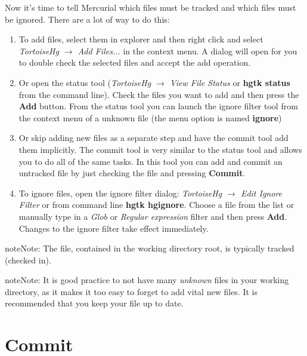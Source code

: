 \documentclass[letterpaper,10pt,english]{manual}
\begin{document}
Now it's time to tell Mercurial which files must be tracked and which
files must be ignored. There are a lot of way to do this:
\begin{enumerate}
\item {} 
To add files, select them in explorer and then right click and select
\emph{TortoiseHg \(\rightarrow\) Add Files...} in the context menu. A
dialog will open for you to double check the selected files and
accept the add operation.

\item {} 
Or open the status tool (\emph{TortoiseHg \(\rightarrow\) View File Status}
or \textbf{hgtk status} from the command line). Check the files you
want to add and then press the \textbf{Add} button. From the
status tool you can launch the ignore filter tool from the context
menu of a unknown file (the menu option is named \textbf{ignore})

\item {} 
Or skip adding new files as a separate step and have the commit tool
add them implicitly.  The commit tool is very similar to the status
tool and allows you to do all of the same tasks. In this tool you
can add and commit an untracked file by just checking the file and
pressing \textbf{Commit}.

\item {} 
To ignore files, open the ignore filter dialog:
\emph{TortoiseHg \(\rightarrow\) Edit Ignore Filter} or from command
line \textbf{hgtk hgignore}. Choose a file from the list or
manually type in a \emph{Glob} or \emph{Regular expression} filter and then
press \textbf{Add}. Changes to the ignore filter take effect
immediately.

\end{enumerate}

\begin{notice}{note}{Note:}
The  file, contained in the working directory root,
is typically tracked (checked in).
\end{notice}

\begin{notice}{note}{Note:}
It is good practice to not have many \emph{unknown} files in your working
directory, as it makes it too easy to forget to add vital new files.
It is recommended that you keep your  file up to
date.
\end{notice}


\section{Commit}
\end{document}
